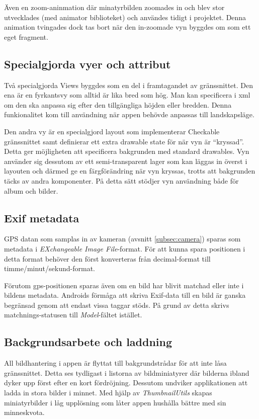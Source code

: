 \documentclass[11px, a4paper]{article}
\begin{document}
	Även en zoom-aninmation där minatyrbilden zoomades in och blev stor utvecklades (med animator biblioteket) och användes tidigt i projektet. Denna animation tvingades dock tas bort när den in-zoomade vyn byggdes om som ett eget fragment.

\subsection{Specialgjorda vyer och attribut}
	Två specialgjorda Views byggdes som en del i framtagandet av gränssnittet. Den ena är en fyrkantsvy som alltid är lika bred som hög. Man kan specificera i xml om den ska anpassa sig efter den tillgängliga höjden eller bredden. Denna funkionalitet kom till användning när appen behövde anpassas till landskapsläge.

	Den andra vy är en specialgjord layout som implementerar Checkable gränssnittet samt definierar ett extra drawable state för när vyn är ``kryssad''. Detta ger möjligheten att specificera bakgrunden med standard drawables. Vyn använder sig dessutom av ett semi-transparent lager som kan läggas in överst i layouten och därmed ge en färgförändring när vyn kryssas, trotts att bakgrunden täcks av andra komponenter. På detta sätt stödjer vyn användning både för album och bilder.

\subsection{Exif metadata}
	GPS datan som samplas in av kameran (avsnitt \ref{subsec:camera}) sparas som metadata i \emph{EXchangeable Image File}-format. För att kunna spara positionen i detta format behöver den först konverteras från decimal-format till timme/minut/sekund-format.

	Förutom gps-positionen sparas även om en bild har blivit matchad eller inte i bildens metadata. Androids förmåga att skriva Exif-data till en bild är ganska begränsad genom att endast vissa taggar stöds. På grund av detta skrivs matchnings-statusen till \emph{Model}-fältet istället.

\subsection{Backgrundsarbete och laddning}
	All bildhantering i appen är flyttat till bakgrundstrådar för att inte låsa gränssnittet\cite{BitmapProcessing}. Detta ses tydligast i listorna av bildminiatyrer där bilderna ibland dyker upp först efter en kort fördröjning. Dessutom undviker applikationen att ladda in stora bilder i minnet. Med hjälp av \emph{ThumbnailUtils} skapas miniatyrbilder i låg upplösning som låter appen hushålla bättre med sin minneskvota.
\end{document}
